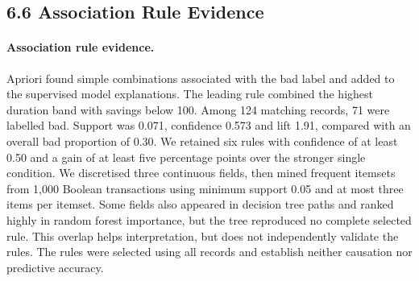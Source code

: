 \subsection*{6.6 Association Rule Evidence}
\makeatletter{}\makeatother
\paragraph{Association rule evidence.}\label{sec:apriori} Apriori found simple combinations associated with the bad label and added to the supervised model explanations. The leading rule combined the highest duration band with savings below 100. Among 124 matching records, 71 were labelled bad. Support was 0.071, confidence 0.573 and lift 1.91, compared with an overall bad proportion of 0.30. We retained six rules with confidence of at least 0.50 and a gain of at least five percentage points over the stronger single condition. We discretised three continuous fields, then mined frequent itemsets from 1,000 Boolean transactions using minimum support 0.05 and at most three items per itemset. Some fields also appeared in decision tree paths and ranked highly in random forest importance, but the tree reproduced no complete selected rule. This overlap helps interpretation, but does not independently validate the rules. The rules were selected using all records and establish neither causation nor predictive accuracy.
